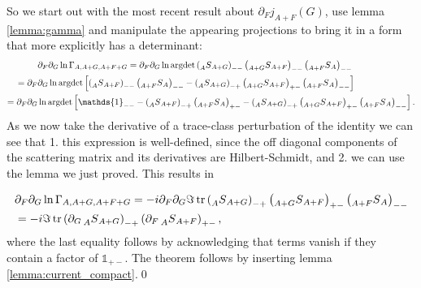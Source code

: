 \documentclass[oneside,reqno,12pt]{amsart}
\DeclareMathOperator{\tr}{tr}
\begin{document}
So we start out with the most recent result about \(\partial_F j_{A+F}(G)\), use lemma \ref{lemma:gamma} and manipulate the appearing projections to bring it in a form that more explicitly has a determinant:
\begin{align*}
&\partial_F \partial_G \ln \Gamma_{A,A+G,A+F+G} =
\partial_F \partial_G \ln \text{argdet} \left( \prescript{}{A}{S}_{A+G}\right)_{--} \left( \prescript{}{A+G}{S}_{A+F}\right)_{--} \left( \prescript{}{A+F}{S}_{A}\right)_{--}\\
=\partial_F& \partial_G \ln \text{argdet} \left[ \left( \prescript{}{A}{S}_{A+F}\right)_{--}\left(\prescript{}{A+F}{S}_A\right)_{--} - \left( \prescript{}{A}{S}_{A+G}\right)_{-+} \left( \prescript{}{A+G}{S}_{A+F}\right)_{+-} \left( \prescript{}{A+F}{S}_{A}\right)_{--}\right]\\
=\partial_F \partial_G & \ln \text{argdet} \left[\mathds{1}_{--}- \left( \prescript{}{A}{S}_{A+F}\right)_{-+}\left(\prescript{}{A+F}{S}_A\right)_{+-} - \left( \prescript{}{A}{S}_{A+G}\right)_{-+} \left( \prescript{}{A+G}{S}_{A+F}\right)_{+-} \left( \prescript{}{A+F}{S}_{A}\right)_{--}\right].
\end{align*}
As we now take the derivative of a trace-class perturbation of the identity we can see that 1. this expression is well-defined, since the off 
diagonal components of the scattering matrix and its derivatives are Hilbert-Schmidt,  and 2. we can use the lemma we just proved. This results in 

\begin{align*}
&\partial_F \partial_G \ln \Gamma_{A,A+G,A+F+G} =
- i \partial_F \partial_G \Im \tr  \left( \prescript{}{A}{S}_{A+G}\right)_{-+} \left( \prescript{}{A+G}{S}_{A+F}\right)_{+-} \left( \prescript{}{A+F}{S}_{A}\right)_{--}\\
&=- i \Im \tr \left( \partial_G \prescript{}{A}{S}_{A+G}\right)_{-+} \left(\partial_F \prescript{}{A}{S}_{A+F}\right)_{+-},
\end{align*}
where the last equality follows by acknowledging that terms vanish if they contain a factor of \(\mathds{1}_{+-}\).
The theorem follows by inserting lemma \ref{lemma:current_compact}.\qed 
\end{document}
